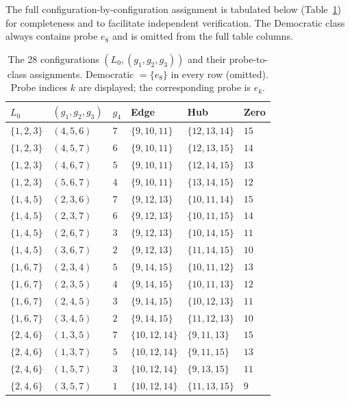 \documentclass[12pt,a4paper]{article}
\begin{document}
The full configuration-by-configuration assignment is tabulated below (Table~\ref{tab:full-configs}) for completeness and to facilitate independent verification.
The Democratic class always contains probe $e_8$ and is omitted from the full table columns.

\begin{table}[htbp]
\centering
\footnotesize
\caption{The 28 configurations $(L_0, (g_1, g_2, g_3))$ and their probe-to-class assignments. Democratic $= \{e_8\}$ in every row (omitted). Probe indices $k$ are displayed; the corresponding probe is $e_k$.}
\label{tab:full-configs}
\begin{tabular}{l|l|l|l|l|l}
\hline
$L_0$ & $(g_1, g_2, g_3)$ & $g_4$ & Edge & Hub & Zero \\
\hline
$\{1,2,3\}$ & $(4,5,6)$ & $7$ & $\{9,10,11\}$ & $\{12,13,14\}$ & $15$ \\
$\{1,2,3\}$ & $(4,5,7)$ & $6$ & $\{9,10,11\}$ & $\{12,13,15\}$ & $14$ \\
$\{1,2,3\}$ & $(4,6,7)$ & $5$ & $\{9,10,11\}$ & $\{12,14,15\}$ & $13$ \\
$\{1,2,3\}$ & $(5,6,7)$ & $4$ & $\{9,10,11\}$ & $\{13,14,15\}$ & $12$ \\
\hline
$\{1,4,5\}$ & $(2,3,6)$ & $7$ & $\{9,12,13\}$ & $\{10,11,14\}$ & $15$ \\
$\{1,4,5\}$ & $(2,3,7)$ & $6$ & $\{9,12,13\}$ & $\{10,11,15\}$ & $14$ \\
$\{1,4,5\}$ & $(2,6,7)$ & $3$ & $\{9,12,13\}$ & $\{10,14,15\}$ & $11$ \\
$\{1,4,5\}$ & $(3,6,7)$ & $2$ & $\{9,12,13\}$ & $\{11,14,15\}$ & $10$ \\
\hline
$\{1,6,7\}$ & $(2,3,4)$ & $5$ & $\{9,14,15\}$ & $\{10,11,12\}$ & $13$ \\
$\{1,6,7\}$ & $(2,3,5)$ & $4$ & $\{9,14,15\}$ & $\{10,11,13\}$ & $12$ \\
$\{1,6,7\}$ & $(2,4,5)$ & $3$ & $\{9,14,15\}$ & $\{10,12,13\}$ & $11$ \\
$\{1,6,7\}$ & $(3,4,5)$ & $2$ & $\{9,14,15\}$ & $\{11,12,13\}$ & $10$ \\
\hline
$\{2,4,6\}$ & $(1,3,5)$ & $7$ & $\{10,12,14\}$ & $\{9,11,13\}$ & $15$ \\
$\{2,4,6\}$ & $(1,3,7)$ & $5$ & $\{10,12,14\}$ & $\{9,11,15\}$ & $13$ \\
$\{2,4,6\}$ & $(1,5,7)$ & $3$ & $\{10,12,14\}$ & $\{9,13,15\}$ & $11$ \\
$\{2,4,6\}$ & $(3,5,7)$ & $1$ & $\{10,12,14\}$ & $\{11,13,15\}$ & $9$ \\

\end{tabular}
\end{table}
\end{document}
